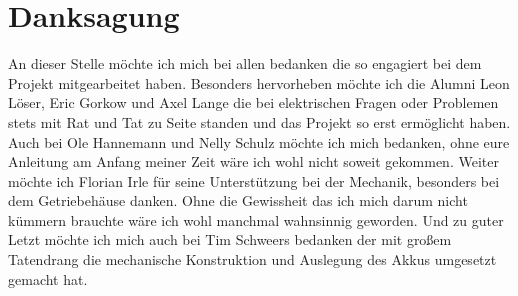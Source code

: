 

\chapter{Danksagung}

An dieser Stelle möchte ich mich bei allen bedanken die so engagiert bei dem Projekt mitgearbeitet haben. Besonders hervorheben möchte ich die Alumni Leon Löser, Eric Gorkow und Axel Lange die bei elektrischen Fragen oder Problemen stets mit Rat und Tat zu Seite standen und das Projekt so erst ermöglicht haben. Auch bei Ole Hannemann und Nelly Schulz möchte ich mich bedanken, ohne eure Anleitung am Anfang meiner Zeit wäre ich wohl nicht soweit gekommen. Weiter möchte ich Florian Irle für seine Unterstützung bei der Mechanik, besonders bei dem Getriebehäuse danken. Ohne die Gewissheit das ich mich darum nicht kümmern brauchte wäre ich wohl manchmal wahnsinnig geworden. Und zu guter Letzt möchte ich mich auch bei Tim Schweers bedanken der mit großem Tatendrang die mechanische Konstruktion und Auslegung des Akkus umgesetzt gemacht hat.